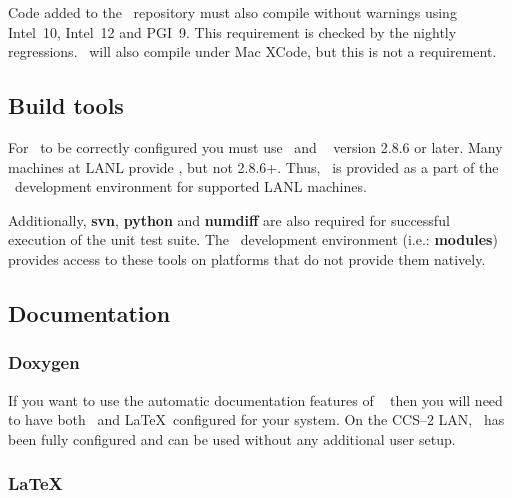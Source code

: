 Code added to the \draco\ repository must also compile without
warnings using Intel~10, Intel~12 and PGI~9.  This requirement is checked by the
nightly regressions.  \draco\ will also compile under Mac XCode, but
this is not a requirement.

\subsection{Build tools}

For \draco\ to be correctly configured you must use \cmake\ and
\ctest~\cite{cmake} version 2.8.6 or later.  Many machines at LANL
provide \cmake, but not 2.8.6+.  Thus, \cmake\ is provided as a part
of the \draco\ development environment for supported LANL machines.

Additionally, \textbf{svn}, \textbf{python} and \textbf{numdiff} are
also required for successful execution of the unit test suite. The
\draco\ development environment (i.e.: \textbf{modules}) provides
access to these tools on platforms that do not provide them natively.

\subsection{Documentation}

\subsubsection{Doxygen}
\label{doxygen}

If you want to use the automatic documentation features of
\draco~\cite{doxygen} then you will need to have both \doxygen\ and
\LaTeX\ configured for your system.  On the CCS--2 LAN, \doxygen\ has
been fully configured and can be used without any additional user
setup. 

\subsubsection{LaTeX}
\label{latex}

